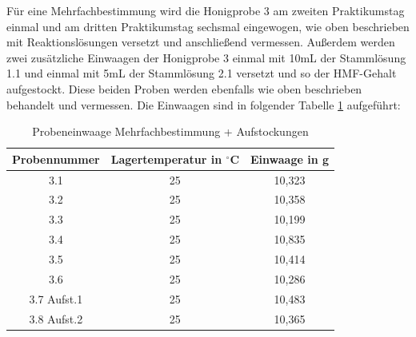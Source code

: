 Für eine Mehrfachbestimmung wird die Honigprobe 3 am zweiten Praktikumstag einmal und am dritten Praktikumstag sechsmal eingewogen, wie oben beschrieben mit Reaktionslösungen versetzt und anschließend vermessen. Außerdem werden zwei zusätzliche Einwaagen der Honigprobe 3 einmal mit 10mL der Stammlösung 1.1 und einmal mit 5mL der Stammlösung 2.1 versetzt und so der HMF-Gehalt aufgestockt. Diese beiden Proben werden ebenfalls wie oben beschrieben behandelt und vermessen. Die Einwaagen sind in folgender Tabelle \ref{tab:Probeneinwaage Mehrfachbestimmung + Aufstockungen} aufgeführt:
\begin{table}[htbp]
	\centering
	\caption{Probeneinwaage Mehrfachbestimmung + Aufstockungen}
		\begin{tabular}{c|c|c} 
			Probennummer & Lagertemperatur in $^\circ$C & Einwaage in g\\
			\hline
			3.1 & 25 & 10,323\\
			\hline
			3.2 & 25 & 10,358\\
			\hline
			3.3 & 25 & 10,199\\
			\hline
			3.4 & 25 & 10,835\\
			\hline
			3.5 & 25 & 10,414\\
			\hline
			3.6 & 25 & 10,286\\
			\hline
			3.7 Aufst.1 & 25 & 10,483\\
			\hline
			3.8 Aufst.2 & 25 & 10,365\\
		\end{tabular}
	\label{tab:Probeneinwaage Mehrfachbestimmung + Aufstockungen}
\end{table}
